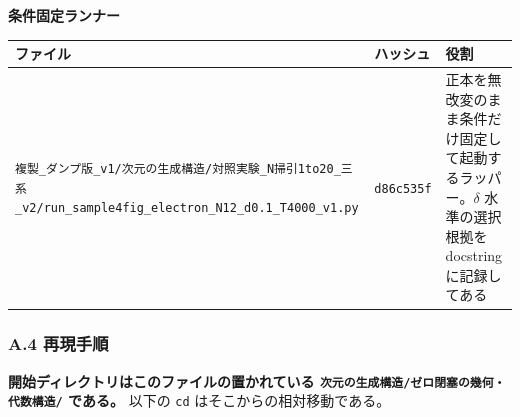 \documentclass[
  10pt,
]{ltjsarticle}
\newcounter{none} %
\begin{document}
\textbf{条件固定ランナー}

{\def\LTcaptype{none} %
\begin{longtable}[]{@{}
  >{\raggedright\arraybackslash}p{}
  >{\raggedright\arraybackslash}p{}
  >{\raggedright\arraybackslash}p{}@{}}
\toprule\noalign{}
\begin{minipage}[b]{\linewidth}\raggedright
ファイル
\end{minipage} & \begin{minipage}[b]{\linewidth}\raggedright
ハッシュ
\end{minipage} & \begin{minipage}[b]{\linewidth}\raggedright
役割
\end{minipage} \\
\midrule\noalign{}
\endhead
\bottomrule\noalign{}
\endlastfoot
\texttt{複製\_ダンプ版\_v1/次元の生成構造/対照実験\_N掃引1to20\_三系\_v2/run\_sample4fig\_electron\_N12\_d0.1\_T4000\_v1.py}
& \texttt{d86c535f} &
正本を無改変のまま条件だけ固定して起動するラッパー。\(\delta\)
水準の選択根拠を docstring に記録してある \\
\end{longtable}
}

\subsubsection{A.4 再現手順}\label{a.4-ux518dux73feux624bux9806}

\textbf{開始ディレクトリはこのファイルの置かれている
\texttt{次元の生成構造/ゼロ閉塞の幾何・代数構造/} である。} 以下の
\texttt{cd} はそこからの相対移動である。
\end{document}
